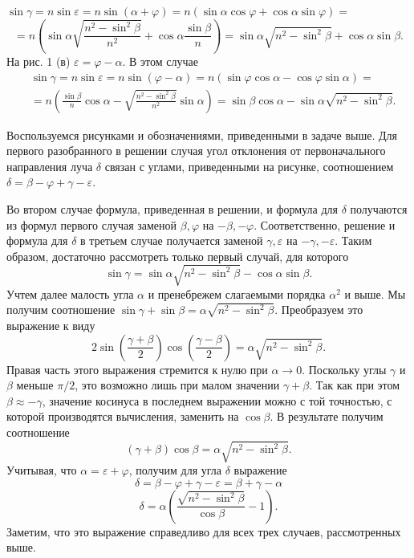\documentclass[a4paper,12pt]{article} %
\begin{document}
$\sin \gamma=n \sin \varepsilon=n \sin (\alpha+\varphi)=n(\sin \alpha \cos \varphi+\cos \alpha \sin \varphi)=$
$$
=n\left(\sin \alpha \sqrt{\frac{n^{2}-\sin ^{2} \beta}{n^{2}}}+\cos \alpha \frac{\sin \beta}{n}\right)=\sin \alpha \sqrt{n^{2}-\sin ^{2} \beta}+\cos \alpha \sin \beta.$$
На рис. 1 (в) $ \varepsilon=\varphi-\alpha$. В этом случае
$$
\begin{aligned}
&\sin \gamma=n \sin \varepsilon=n \sin (\varphi-\alpha)=n(\sin \varphi \cos \alpha-\cos \varphi \sin \alpha)= \\
&=n\left(\frac{\sin \beta}{n} \cos \alpha-\sqrt{\frac{n^{2}-\sin ^{2} \beta}{n^{2}}} \sin \alpha\right)=\sin \beta \cos \alpha-\sin \alpha \sqrt{n^{2}-\sin ^{2} \beta} .
\end{aligned}
$$

Воспользуемся рисунками и обозначениями, приведенными в задаче выше. Для первого разобранного в решении случая угол отклонения от первоначального направления луча $\delta$ связан с углами, приведенными на рисунке, соотношением $\delta=\beta-\varphi+\gamma-\varepsilon$.

Во втором случае формула, приведенная в решении, и формула для $\delta$ получаются из формул первого случая заменой $\beta, \varphi$ на $-\beta,-\varphi$. Соответственно, решение и формула для $\delta$ в третьем случае получается заменой $\gamma, \varepsilon$ на $-\gamma,-\varepsilon$. Таким образом, достаточно рассмотреть только первый случай, для которого
$$
\sin \gamma=\sin \alpha \sqrt{n^{2}-\sin ^{2} \beta}-\cos \alpha \sin \beta .
$$
Учтем далее малость угла $\alpha$ и пренебрежем слагаемыми порядка $\alpha^{2}$ и выше. Мы получим соотношение $\sin \gamma+\sin \beta = \alpha \sqrt{n^{2}-\sin ^{2} \beta}$. Преобразуем это выражение к виду
$$
2 \sin \left(\frac{\gamma+\beta}{2}\right) \cos \left(\frac{\gamma-\beta}{2}\right)=\alpha \sqrt{n^{2}-\sin ^{2} \beta} .
$$
Правая часть этого выражения стремится к нулю при $\alpha \rightarrow 0$. Поскольку углы $\gamma$ и $\beta$ меньше $\pi / 2$, это возможно лишь при малом значении $\gamma+\beta$. Так как при этом $\beta \approx-\gamma$, значение косинуса в последнем выражении можно с той точностью, с которой производятся вычисления, заменить на $\cos \beta$. В результате получим соотношение
$$
(\gamma+\beta) \cos \beta=\alpha \sqrt{n^{2}-\sin ^{2} \beta} .
$$
Учитывая, что $\alpha=\varepsilon+\varphi$, получим для угла $\delta$ выражение
$$
\delta=\beta-\varphi+\gamma-\varepsilon = \beta + \gamma - \alpha
$$
$$
\delta=\alpha\left(\frac{\sqrt{n^{2}-\sin ^{2} \beta}}{\cos \beta}-1\right) .
$$
Заметим, что это выражение справедливо для всех трех случаев, рассмотренных выше.
\end{document}
